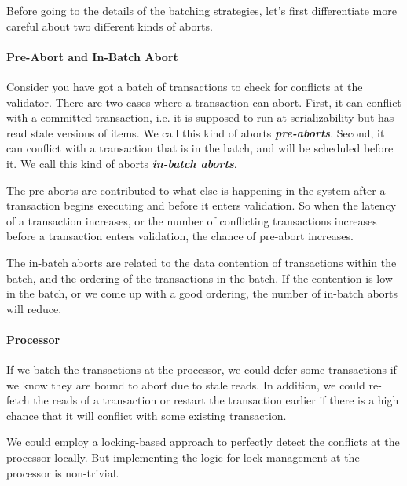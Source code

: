 Before going to the details of the batching strategies, let's first differentiate more careful about two different kinds of aborts.

\paragraph{Pre-Abort and In-Batch Abort}
Consider you have got a batch of transactions to check for conflicts at the validator. 
There are two cases where a transaction can abort.
First, it can conflict with a committed transaction, i.e. it is supposed to run at serializability 
but has read stale versions of items. 
We call this kind of aborts \textbf{\emph{pre-aborts}}. 
Second, it can conflict with a transaction that is in the batch, and will be scheduled before it.
We call this kind of aborts \textbf{\emph{in-batch aborts}}.

The pre-aborts are contributed to what else is happening in the system after a transaction begins executing and before it enters validation. So when the latency of a transaction increases, or the number of conflicting transactions increases before a transaction enters validation, the chance of pre-abort increases.

The in-batch aborts are related to the data contention of transactions within the batch, and the ordering of the transactions in the batch. If the contention is low in the batch, or we come up with a good ordering, the number of in-batch aborts will reduce.

\paragraph{Processor} 

If we batch the transactions at the processor, we could defer some transactions if we know they are bound to abort due to stale reads. In addition, we could re-fetch the reads of a transaction or restart the transaction earlier if there is a high chance that it will conflict with some existing transaction.

We could employ a locking-based approach to perfectly detect the conflicts at the processor locally. But implementing the logic for lock management at the processor is non-trivial. 

